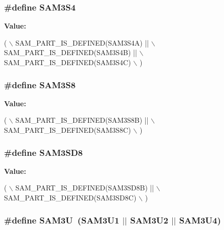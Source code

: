 \hypertarget{group__sam__part__macros__group_gae92413f616568bd2f38622e20f4925e0}{
\subsubsection[{S\-A\-M3\-S4}]{\setlength{\rightskip}{0pt plus 5cm}\#define S\-A\-M3\-S4}}\label{group__sam__part__macros__group_gae92413f616568bd2f38622e20f4925e0}
{\bfseries Value\-:}
\begin{DoxyCode}
( \(\backslash\)
                SAM\_PART\_IS\_DEFINED(SAM3S4A) || \(\backslash\)
                SAM\_PART\_IS\_DEFINED(SAM3S4B) || \(\backslash\)
                SAM\_PART\_IS\_DEFINED(SAM3S4C) \(\backslash\)
                )
\end{DoxyCode}
\hypertarget{group__sam__part__macros__group_gaea8f1cca303520385d12110ad8e8bafe}{
\subsubsection[{S\-A\-M3\-S8}]{\setlength{\rightskip}{0pt plus 5cm}\#define S\-A\-M3\-S8}}\label{group__sam__part__macros__group_gaea8f1cca303520385d12110ad8e8bafe}
{\bfseries Value\-:}
\begin{DoxyCode}
( \(\backslash\)
                SAM\_PART\_IS\_DEFINED(SAM3S8B) || \(\backslash\)
                SAM\_PART\_IS\_DEFINED(SAM3S8C) \(\backslash\)
                )
\end{DoxyCode}
\hypertarget{group__sam__part__macros__group_ga9f16069247b2e38ddb0bcaa912750a4f}{
\subsubsection[{S\-A\-M3\-S\-D8}]{\setlength{\rightskip}{0pt plus 5cm}\#define S\-A\-M3\-S\-D8}}\label{group__sam__part__macros__group_ga9f16069247b2e38ddb0bcaa912750a4f}
{\bfseries Value\-:}
\begin{DoxyCode}
( \(\backslash\)
                SAM\_PART\_IS\_DEFINED(SAM3SD8B) || \(\backslash\)
                SAM\_PART\_IS\_DEFINED(SAM3SD8C) \(\backslash\)
                )
\end{DoxyCode}
\hypertarget{group__sam__part__macros__group_ga987abac1ef39b0b447b8b11419942476}{
\subsubsection[{S\-A\-M3\-U}]{\setlength{\rightskip}{0pt plus 5cm}\#define S\-A\-M3\-U~(S\-A\-M3\-U1 $|$$|$ S\-A\-M3\-U2 $|$$|$ S\-A\-M3\-U4)}}\label{group__sam__part__macros__group_ga987abac1ef39b0b447b8b11419942476}
